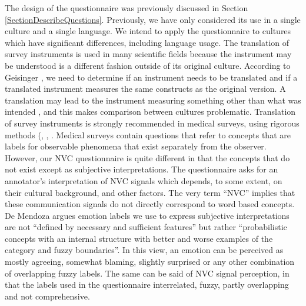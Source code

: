 The design of the questionnaire was previously discussed in Section \ref{SectionDescribeQuestions}. Previously, we have only considered its use in a single culture and a single language. We intend to apply the questionnaire to cultures which have significant differences, including language usage. The translation of survey instruments is used in many scientific fields because the instrument may be understood is a different fashion outside of its original culture. According to Geisinger \cite{Geisinger1994}, we need to determine if an instrument needs to be translated and if a translated instrument measures the same constructs as the original version. A translation may lead to the instrument measuring something other than what was intended \cite{Poyatos1997}, and this makes comparison between cultures problematic. Translation of survey instruments is strongly recommended in medical surveys, using rigorous methods (\cite{Gjersing2010}, \cite{Beaton2000}, \cite{Morales2001}. Medical surveys contain questions that refer to concepts that are labels for observable phenomena that exist separately from the observer. However, our \ac{NVC} questionnaire is quite different in that the concepts that do not exist except as subjective interpretations. The questionnaire asks for an annotator's interpretation of \ac{NVC} signals which depends, to some extent, on their cultural background, and other factors. The very term ``\ac{NVC}'' implies that these communication signals do not directly correspond to word based concepts. De Mendoza \cite{Mendoza2008} argues emotion labels we use to express subjective interpretations are not ``defined by necessary and sufficient features'' but rather ``probabilistic concepts with an internal structure with better and worse examples of the category and fuzzy boundaries''. In this view, an emotion can be perceived as mostly agreeing, somewhat blaming, slightly surprised or any other combination of overlapping fuzzy labels. The same can be said of \ac{NVC} signal perception, in that the labels used in the questionnaire interrelated, fuzzy, partly overlapping and not comprehensive.


